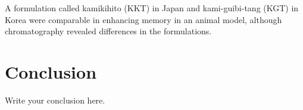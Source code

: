 \documentclass[twocolumn]{article}
\begin{document}
A formulation called kamikihito (KKT) in Japan
and kami-guibi-tang (KGT) in Korea
were comparable in enhancing memory in an animal model,
although chromatography revealed differences in the formulations.
\cite{watari2015comparing}





\section{Conclusion}
Write your conclusion here.












\end{document}
